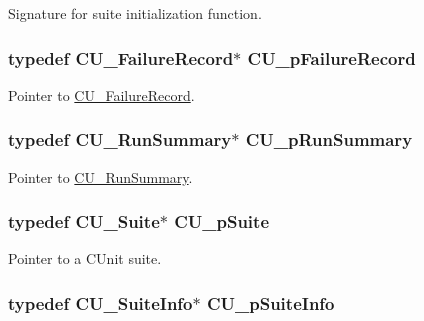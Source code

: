 Signature for suite initialization function. 

\hypertarget{group___framework_gafe3d04f76bf2fac18a3b6a9fd9368308}{
\subsubsection[{C\+U\+\_\+p\+Failure\+Record}]{\setlength{\rightskip}{0pt plus 5cm}typedef {\bf C\+U\+\_\+\+Failure\+Record}$\ast$ {\bf C\+U\+\_\+p\+Failure\+Record}}}\label{group___framework_gafe3d04f76bf2fac18a3b6a9fd9368308}


Pointer to \hyperlink{struct_c_u___failure_record}{C\+U\+\_\+\+Failure\+Record}. 

\hypertarget{group___framework_gad47d258dca538a934dccaeab9392b391}{
\subsubsection[{C\+U\+\_\+p\+Run\+Summary}]{\setlength{\rightskip}{0pt plus 5cm}typedef {\bf C\+U\+\_\+\+Run\+Summary}$\ast$ {\bf C\+U\+\_\+p\+Run\+Summary}}}\label{group___framework_gad47d258dca538a934dccaeab9392b391}


Pointer to \hyperlink{struct_c_u___run_summary}{C\+U\+\_\+\+Run\+Summary}. 

\hypertarget{group___framework_gaba832ae8b235f5e70d6a4ac9c3bb1219}{
\subsubsection[{C\+U\+\_\+p\+Suite}]{\setlength{\rightskip}{0pt plus 5cm}typedef {\bf C\+U\+\_\+\+Suite}$\ast$ {\bf C\+U\+\_\+p\+Suite}}}\label{group___framework_gaba832ae8b235f5e70d6a4ac9c3bb1219}


Pointer to a C\+Unit suite. 

\hypertarget{group___framework_gaf0deaec93829917ef410128e19ab8887}{
\subsubsection[{C\+U\+\_\+p\+Suite\+Info}]{\setlength{\rightskip}{0pt plus 5cm}typedef {\bf C\+U\+\_\+\+Suite\+Info}$\ast$ {\bf C\+U\+\_\+p\+Suite\+Info}}}\label{group___framework_gaf0deaec93829917ef410128e19ab8887}


